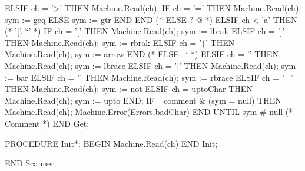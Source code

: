 \documentclass[utf8]{lgu}
\begin{document}
\begin{modula2long}
      ELSIF ch = '>' THEN
        Machine.Read(ch);
        IF ch = '=' THEN Machine.Read(ch); sym := geq ELSE sym := gtr END
      END (* ELSE ? @ *)
    ELSIF ch < 'a' THEN (* '['..'`' *)
      IF    ch = '[' THEN Machine.Read(ch); sym := lbrak
      ELSIF ch = ']' THEN Machine.Read(ch); sym := rbrak
      ELSIF ch = '↑' THEN Machine.Read(ch); sym := arrow
      END (* ELSE \ ` *)
    ELSIF ch = '{' THEN Machine.Read(ch); sym := lbrace
    ELSIF ch = '|' THEN Machine.Read(ch); sym := bar
    ELSIF ch = '}' THEN Machine.Read(ch); sym := rbrace
    ELSIF ch = '¬' THEN Machine.Read(ch); sym := not
    ELSIF ch = uptoChar THEN Machine.Read(ch); sym := upto
    END;
    IF ¬comment & (sym = null) THEN
      Machine.Read(ch);
      Machine.Error(Errors.badChar)
    END
  UNTIL sym # null (* Comment *)
END Get;

PROCEDURE Init*;
BEGIN
  Machine.Read(ch)
END Init;

END Scanner.
\end{modula2long}
\end{document}

